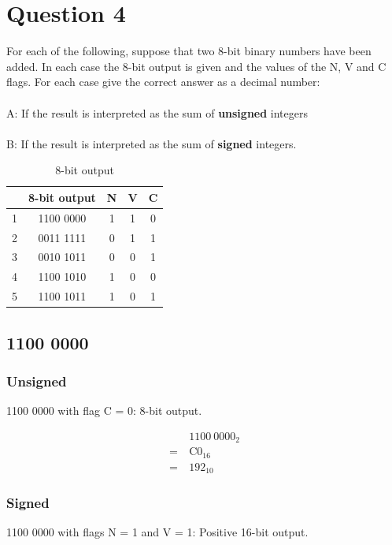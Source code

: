 \documentclass[12pt,a4paper]{article}
\begin{document}
\section{Question 4}

For each of the following, suppose that two 8-bit binary numbers have been added. In each case the 8-bit output is given and the values of the N, V and C flags. For each case give the correct answer as a decimal number: \\
\\
A: If the result is interpreted as the sum of \textbf{unsigned} integers \\
\\
B: If the result is interpreted as the sum of \textbf{signed} integers.

\begin{table}[!h]
\centering
\caption{8-bit output}
\begin{tabular}{c|c|c|c|c}
  & 8-bit output & N & V & C \\ \hline
1 & 1100 0000 & 1 & 1 & 0 \\ \hline
2 & 0011 1111 & 0 & 1 & 1 \\ \hline
3 & 0010 1011 & 0 & 0 & 1 \\ \hline
4 & 1100 1010 & 1 & 0 & 0 \\ \hline
5 & 1100 1011 & 1 & 0 & 1
\end{tabular}
\end{table}

\newpage
\subsection{1100 0000}

\subsubsection{Unsigned}

1100 0000 with flag C = 0: 8-bit output.

\begin{align*}
&\ 1100\ 0000_{2}    \\
=&\ \text{C}0_{16} \\
=&\ 192_{10}
\end{align*}

\subsubsection{Signed}

1100 0000 with flags N = 1 and V = 1: Positive 16-bit output.
\end{document}
